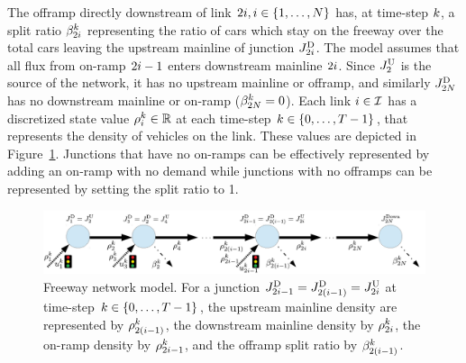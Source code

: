 The offramp directly downstream of link $2\link,i\in\intrange 1{\nlinks}$
has, at time-step $k$, a split ratio $\beta_{2i}^{k}$
representing the ratio of cars which stay on the freeway over the
total cars leaving the upstream mainline of junction $J_{2i}^{\text{D}}$.
The model assumes that all flux from on-ramp $2i-1$ enters downstream
mainline $2i$. Since $J_{2}^{\text{U}}$ is the source of the network,
it has no upstream mainline or offramp, and similarly $J_{2N}^{\text{D}}$
has no downstream mainline or on-ramp ($\beta_{2N}^{k}=0$).
Each link $i\in\mathcal{I}$ has a discretized state value $\rho_{i}^{k}\in\mathbb{R}$
at each time-step $\tind\in\intrange 0{\ntime-1}$, that represents
the density of vehicles on the link. These values are depicted in
Figure~\ref{fig:Freeway-network-junction}. Junctions that have no
on-ramps can be effectively represented by adding an on-ramp with no
demand while junctions with no offramps can be represented by setting
the split ratio to 1.
\begin{figure}
	\begin{centering}
		\includegraphics[width=1\columnwidth]{figs-gen/rm-junction-2}
		\par\end{centering}
				
		\caption{Freeway network model. For a junction $\jdown{2\link-1}=\jdown{2\left(\link-1\right)}=\jup{2\link}$
			at time-step $\tind\in\intrange 0{\ntime-1}$, the upstream mainline
			density are represented by $\densitydiscrete{2\left(\link-1\right)}{\tind}$,
			the downstream mainline density by $\rho_{2i}^{k}$,
			the on-ramp density by $\rho_{2i-1}^{k}$, and the
			offramp split ratio by $\splitratio_{2\left(\link-1\right)}^{\tind}$.\label{fig:Freeway-network-junction}}
		\end{figure}
				
